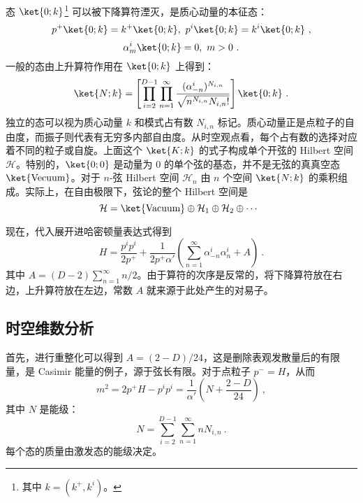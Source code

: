 态 $\ket{0; k}$\footnote{其中 $k = (k^+, k^i)$。} 可以被下降算符湮灭，是质心动量的本征态：
\begin{equation}
	p^+\ket{0; k} = k^+\ket{0; k}, ~ p^i\ket{0; k} = k^i \ket{0; k} ~,
\end{equation}
\begin{equation}
	\alpha_m^i \ket{0; k} = 0, ~ m > 0 ~.
\end{equation}
一般的态由上升算符作用在 $\ket{0; k}$ 上得到：
\begin{equation}
	\ket{N; k} = \left[\prod_{i=2}^{D-1} \prod_{n=1}^\infty \frac{(\alpha_{-n}^i)^{N_{i, n}}}{\sqrt{n^{N_{i, n}} N_{i, n}!}}\right] \ket{0; k} ~.
\end{equation}
独立的态可以视为质心动量 $k$ 和模式占有数 $N_{i, n}$ 标记。质心动量正是点粒子的自由度，而振子则代表有无穷多内部自由度。从时空观点看，每个占有数的选择对应着不同的粒子或自旋。上面这个 $\ket{K; k}$ 的式子构成单个开弦的 Hilbert 空间 $\mathcal H$。特别的，$\ket{0; 0}$ 是动量为 $0$ 的单个弦的基态，并不是无弦的真真空态 $\ket{\text{Vecuum}}$。对于 $n$-弦 Hilbert 空间 $\mathcal H_n$ 由 $n$ 个空间 $\ket{N; k}$ 的乘积组成。实际上，在自由极限下，弦论的整个 Hilbert 空间是 
\begin{equation}
	\mathcal H = \ket{\text{Vacuum}} \oplus \mathcal H_1 \oplus \mathcal H_2 \oplus \cdots ~~
\end{equation}

现在，代入展开进哈密顿量表达式得到 
\begin{equation}
	H = \frac{p^i p^i}{2 p^+} + \frac{1}{2 p^+ \alpha' } \left(\sum_{n=1}^\infty \alpha_{-n}^i \alpha_n^i + A\right) ~.
\end{equation}
其中 $A = (D-2) \sum_{n=1}^\infty n/2$。由于算符的次序是反常的，将下降算符放在右边，上升算符放在左边，常数 $A$ 就来源于此处产生的对易子。

\subsection{时空维数分析}

首先，进行重整化可以得到 $A = (2-D)/24$，这是删除表观发散量后的有限量，是 Casimir 能量的例子，源于弦长有限。对于点粒子 $p^- = H$，从而 
\begin{equation}
	m^2 = 2 p^+ H - p^i p^i = \frac{1}{\alpha'} \left(N + \frac{2-D}{24}\right) ~,
\end{equation}
其中 $N$ 是能级：
\begin{equation}
	N = \sum_{i=2}^{D-1} \sum_{n=1}^\infty n N_{i, n} ~.
\end{equation}
每个态的质量由激发态的能级决定。

